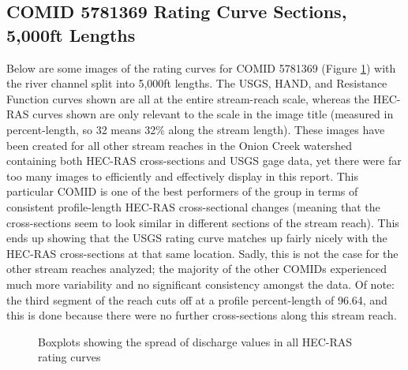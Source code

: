 \documentclass[12pt]{article}
\begin{document}
\subsection*{COMID 5781369 Rating Curve Sections, 5,000ft Lengths}

Below are some images of the rating curves for COMID 5781369 (Figure \ref{fig:5781369ratingcurves}) with the river channel split into 5,000ft lengths. The USGS, HAND, and Resistance Function curves shown are all at the entire stream-reach scale, whereas the HEC-RAS curves shown are only relevant to the scale in the image title (measured in percent-length, so 32 means 32\% along the stream length). These images have been created for all other stream reaches in the Onion Creek watershed containing both HEC-RAS cross-sections and USGS gage data, yet there were far too many images to efficiently and effectively display in this report. This particular COMID is one of the best performers of the group in terms of consistent profile-length HEC-RAS cross-sectional changes (meaning that the cross-sections seem to look similar in different sections of the stream reach). This ends up showing that the USGS rating curve matches up fairly nicely with the HEC-RAS cross-sections at that same location. Sadly, this is not the case for the other stream reaches analyzed; the majority of the other COMIDs experienced much more variability and no significant consistency amongst the data. Of note: the third segment of the reach cuts off at a profile percent-length of 96.64, and this is done because there were no further cross-sections along this stream reach.

\begin{figure}[h!]
\caption{Boxplots showing the spread of discharge values in all HEC-RAS rating curves} \label{fig:5781369ratingcurves}
\end{figure}
\end{document}
